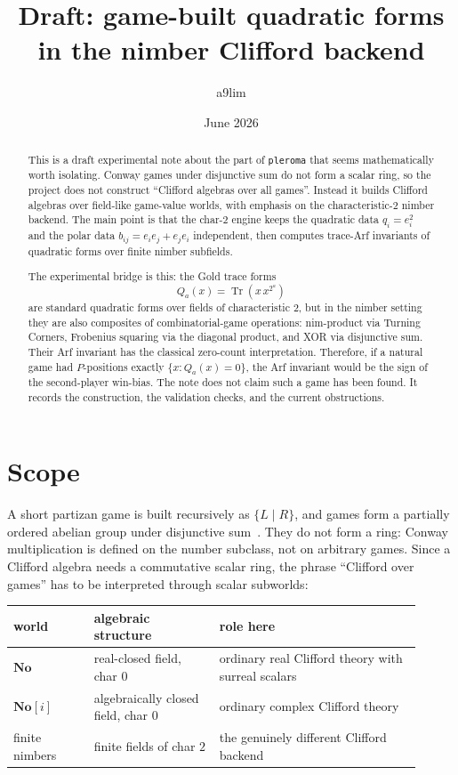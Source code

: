 \documentclass[11pt]{article}
\title{Draft: game-built quadratic forms in the nimber Clifford backend}
\author{a9lim}
\date{June 2026}
\theoremstyle{definition}
\newcommand{\No}{\mathbf{No}}
\newcommand{\Tr}{\operatorname{Tr}}
\begin{document}
\maketitle

\begin{abstract}
This is a draft experimental note about the part of \texttt{pleroma} that seems
mathematically worth isolating. Conway games under disjunctive sum do not form a
scalar ring, so the project does not construct ``Clifford algebras over all
games''. Instead it builds Clifford algebras over field-like game-value worlds,
with emphasis on the characteristic-$2$ nimber backend. The main point is that
the char-$2$ engine keeps the quadratic data $q_i=e_i^2$ and the polar data
$b_{ij}=e_i e_j+e_j e_i$ independent, then computes trace-Arf invariants of
quadratic forms over finite nimber subfields.

The experimental bridge is this: the Gold trace forms
\[
  Q_a(x)=\Tr(x\,x^{2^a})
\]
are standard quadratic forms over fields of characteristic $2$, but in the
nimber setting they are also composites of combinatorial-game operations:
nim-product via Turning Corners, Frobenius squaring via the diagonal product,
and XOR via disjunctive sum. Their Arf invariant has the classical zero-count
interpretation. Therefore, if a natural game had $P$-positions exactly
$\{x:Q_a(x)=0\}$, the Arf invariant would be the sign of the second-player
win-bias. The note does not claim such a game has been found. It records the
construction, the validation checks, and the current obstructions.
\end{abstract}

\section{Scope}

A short partizan game is built recursively as $\{L\mid R\}$, and games form a
partially ordered abelian group under disjunctive sum~\cite{Conway76,WW}. They
do not form a ring: Conway multiplication is defined on the number subclass,
not on arbitrary games. Since a Clifford algebra needs a commutative scalar
ring, the phrase ``Clifford over games'' has to be interpreted through scalar
subworlds:

\begin{center}
\begin{tabular}{@{}>{\raggedright\arraybackslash}p{0.18\linewidth}
>{\raggedright\arraybackslash}p{0.28\linewidth}
>{\raggedright\arraybackslash}p{0.45\linewidth}@{}}
\toprule
world & algebraic structure & role here \\
\midrule
$\No$ & real-closed field, char $0$ & ordinary real Clifford theory with surreal scalars \\
$\No[i]$ & algebraically closed field, char $0$ & ordinary complex Clifford theory \\
finite nimbers & finite fields of char $2$ & the genuinely different Clifford backend \\
\bottomrule
\end{tabular}
\end{center}
\end{document}
